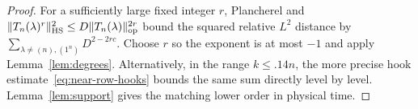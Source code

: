 \begin{proof}
For a sufficiently large fixed integer $r$, Plancherel and $\|T_n(\lambda)^r\|_{\mathrm{HS}}^2\le D\|T_n(\lambda)\|_{\mathrm{op}}^{2r}$ bound the squared relative $L^2$ distance by $\sum_{\lambda\ne(n),(1^n)}D^{2-2rc}$. Choose $r$ so the exponent is at most $-1$ and apply Lemma~\ref{lem:degrees}. Alternatively, in the range $k\le.14n$, the more precise hook estimate~\eqref{eq:near-row-hooks} bounds the same sum directly level by level. Lemma~\ref{lem:support} gives the matching lower order in physical time.
\end{proof}
